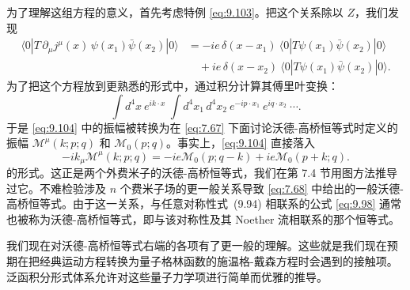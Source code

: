 为了理解这组方程的意义，首先考虑特例 \eqref{eq:9.103}。把这个关系除以 $Z$，我们发现
\begin{equation}
  \begin{aligned}
    \langle 0|T\,\partial_\mu j^\mu(x)\,\psi(x_1)\bar{\psi}(x_2)|0\rangle
    &= -ie\,\delta(x-x_1)\ \langle 0|T\psi(x_1)\bar{\psi}(x_2)|0\rangle\\
    &\quad + ie\,\delta(x-x_2)\ \langle 0|T\psi(x_1)\bar{\psi}(x_2)|0\rangle .
  \end{aligned}
  \label{eq:9.104}
\end{equation}
为了把这个方程放到更熟悉的形式中，通过积分计算其傅里叶变换：
\begin{equation}
  \int d^4x\ e^{ik\cdot x}\ \int d^4x_1\,d^4x_2\ e^{-ip\cdot x_1}\
    e^{iq\cdot x_2}\ \cdots .
  \label{eq:9.105}
\end{equation}
于是 \eqref{eq:9.104} 中的振幅被转换为在 \eqref{eq:7.67} 下面讨论沃德-高桥恒等式时定义的振幅 $\mathcal{M}^\mu(k;p;q)$ 和 $\mathcal{M}_0(p;q)$。事实上，\eqref{eq:9.104} 直接落入
\begin{equation}
  -ik_\mu\mathcal{M}^\mu(k;p;q) = -ie\mathcal{M}_0(p;q-k)
    + ie\mathcal{M}_0(p+k;q) .
  \label{eq:9.106}
\end{equation}
的形式。这正是两个外费米子的沃德-高桥恒等式，我们在第 7.4 节用图方法推导过它。不难检验涉及 $n$ 个费米子场的更一般关系导致 \eqref{eq:7.68} 中给出的一般沃德-高桥恒等式。由于这一关系，与任意对称性式~(9.94) 相联系的公式 \eqref{eq:9.98} 通常也被称为沃德-高桥恒等式，即与该对称性及其 Noether 流相联系的那个恒等式。

我们现在对沃德-高桥恒等式右端的各项有了更一般的理解。这些就是我们现在预期在把经典运动方程转换为量子格林函数的施温格-戴森方程时会遇到的接触项。泛函积分形式体系允许对这些量子力学项进行简单而优雅的推导。

\problems

